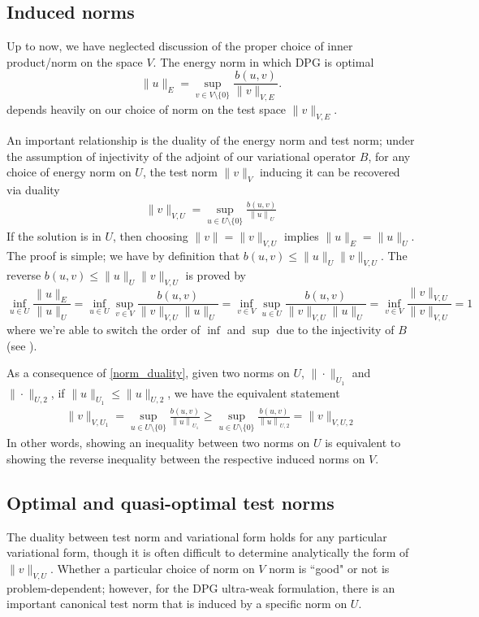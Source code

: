 \documentclass[11pt,onecolumn]{scrartcl}
\begin{document}
\subsection{Induced norms}

Up to now, we have neglected discussion of the proper choice of inner product/norm on the space $V$.  The energy norm in which DPG is optimal 
\[
\|u\|_E = \sup_{v \in V\setminus \{0\}} \frac{b(u,v)}{\|v\|_{V,E}}.
\]
depends heavily on our choice of norm on the test space $\|v\|_{V,E}$. 

An important relationship is the duality of the energy norm and test norm; under the assumption of injectivity of the adjoint of our variational 	operator $B$, for any choice of energy norm on $U$, the test norm $\|v\|_V$ inducing it can be recovered via duality
\begin{align}
\| v \|_{V,U} = \sup_{u \in U\setminus \{0\}} \frac{b\left(u,v\right)}{\left\| u \right\|_U} \label{norm_duality}
\end{align}
If the solution is in $U$, then choosing $\|v\|=\|v\|_{V,U}$ implies $\|u\|_E = \|u\|_U$. The proof is simple; we have by definition that $b(u,v) \leq \|u\|_U\|v\|_{V,U}$. The reverse $b(u,v) \leq \|u\|_U\|v\|_{V,U}$ is proved by
\[
\inf_{u\in U} \frac{\|u\|_E}{\|u\|_U} = \inf_{u\in U} \sup_{v\in V}\frac{b(u,v)}{\|v\|_{V,U}\|u\|_U} = \inf_{v\in V} \sup_{u\in U}\frac{b(u,v)}{\|v\|_{V,U}\|u\|_U} = \inf_{v\in V} \frac{\|v\|_{V,U}}{\|v\|_{V,U}} = 1
\]
where we're able to switch the order of $\inf$ and $\sup$ due to the injectivity of $B$ (see  \cite{BabuskaEquivBrezzi}). 

As a consequence of \eqref{norm_duality}, given two norms on $U$, $\|\cdot\|_{U_1}$ and $\|\cdot\|_{U,2}$, if $\|u\|_{U_1} \leq \|u\|_{U,2}$, we have the equivalent statement
\begin{align*}
\| v \|_{V,U_1} = \sup_{u \in U\setminus \{0\}} \frac{b\left(u,v\right)}{\left\| u \right\|_{U_1}} \geq  \sup_{u \in U\setminus \{0\}} \frac{b\left(u,v\right)}{\left\| u \right\|_{U,2}} = \| v \|_{V,U,2} 
\end{align*}
In other words, showing an inequality between two norms on $U$ is equivalent to showing the reverse inequality between the respective induced norms on $V$.  

\subsection{Optimal and quasi-optimal test norms}

The duality between test norm and variational form holds for any particular variational form, though it is often difficult to determine analytically the form of $\|v\|_{V,U}$.  Whether a particular choice of norm on $V$ norm is ``good" or not is problem-dependent; however, for the DPG ultra-weak formulation, there is an important canonical test norm that is induced by a specific norm on $U$.  
\end{document}
